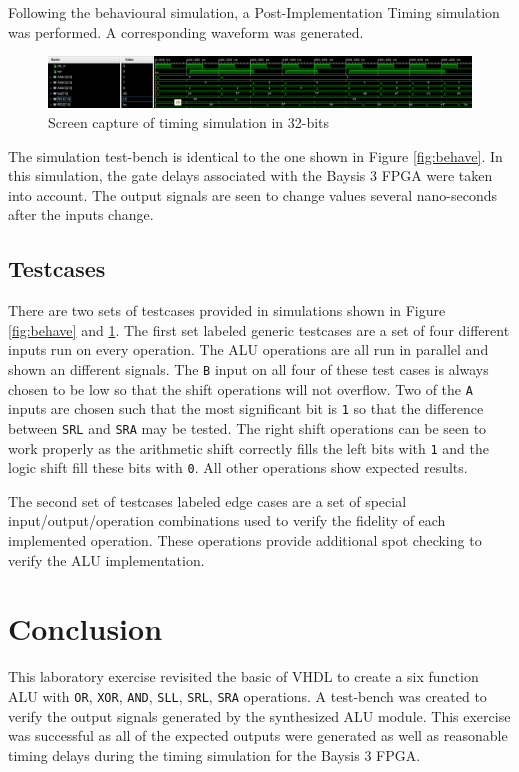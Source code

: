 \documentclass[CMPE]{../KGCOEReport}
\def\code#1{\texttt{#1}}
\begin{document}
    \pagebreak

    Following the behavioural simulation, a Post-Implementation Timing simulation was performed.
    A corresponding waveform was generated.

    \begin{figure}[h!]
        \centering
        \includegraphics[width=\textwidth]{img/synthesis-timing}
        \caption{Screen capture of timing simulation in 32-bits}
        \label{fig:timing}
    \end{figure}

    The simulation test-bench is identical to the one shown in Figure \ref{fig:behave}.
    In this simulation, the gate delays associated with the Baysis 3 FPGA were taken into account.
    The output signals are seen to change values several nano-seconds after the inputs change.

    \subsection*{Testcases}
    There are two sets of testcases provided in simulations shown in Figure \ref{fig:behave} and \ref{fig:timing}.
    The first set labeled generic testcases are a set of four different inputs run on every operation.
    The ALU operations are all run in parallel and shown an different signals.
    The \code{B} input on all four of these test cases is always chosen to be low so that the shift operations
    will not overflow.
    Two of the \code{A} inputs are chosen such that the most significant bit is \code{1} so that the difference between
    \code{SRL} and \code{SRA} may be tested.
    The right shift operations can be seen to work properly as the arithmetic shift correctly fills the left bits with
    \code{1} and the logic shift fill these bits with \code{0}.
    All other operations show expected results.

    The second set of testcases labeled edge cases are a set of special input/output/operation combinations used to
    verify the fidelity of each implemented operation.
    These operations provide additional spot checking to verify the ALU implementation.

    \section*{Conclusion}
    This laboratory exercise revisited the basic of VHDL to create a six function ALU with \code{OR}, \code{XOR},
    \code{AND}, \code{SLL}, \code{SRL}, \code{SRA} operations.
    A test-bench was created to verify the output signals generated by the synthesized ALU module.
    This exercise was successful as all of the expected outputs were generated as well as reasonable timing delays
    during the timing simulation for the Baysis 3 FPGA.
\end{document}

